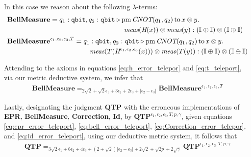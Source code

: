 \begin{example}
    In this case we reason about the following $\lambda$-terms:
    \begin{align*}
      &\textbf{BellMeasure} =  q_{1}: \mathtt{qbit}, q_{2}: \mathtt{qbit}
   \vljud  \text{pm} \, \textit{CNOT} (q_{1},q_{2})
  \,  \text{to}\, x \otimes y. \,
    \\ 
   & \hspace{170pt} \textit{meas} (\textit{H} (x)) \otimes \textit{meas} (y) : \left(\typeI\oplus \typeI\right) \otimes \left(\typeI\oplus
   \typeI\right) \\
      & \textbf{BellMeasure}^{\epsilon_1, \epsilon_2,\epsilon_3,T} =  q_{1}: \mathtt{qbit}, q_{2}: \mathtt{qbit}
      \vljud  \text{pm} \, \textit{CNOT} (q_{1},q_{2})
     \,  \text{to}\, x \otimes y. \,
     \\
      &  \hspace{120pt} \textit{meas} (T(\textit{H}^{\epsilon_1, \epsilon_2,\epsilon_3} (x))) \otimes \textit{meas} ( T(y)):\left(\typeI\oplus \typeI\right) \otimes \left(\typeI\oplus
      \typeI\right) \\
    \end{align*}
  
  Attending to the axioms in equations \eqref{eq:h_error_telepor} and \eqref{eq:t_teleport}, via our metric deductive system, we infer that
  \begin{align} \label{eq:bell_error_teleport}
    \textbf{BellMeasure} =_{2 \sqrt{2} + \sqrt{2}\epsilon_1 + 3\epsilon_2 + 2\epsilon_3 + |\epsilon_2-\epsilon_3|} \textbf{BellMeasure}^{\epsilon_1, \epsilon_2,\epsilon_3,T}
  \end{align}

  Lastly, designating the judgment \textbf{QTP} with the erroneous implementations of \textbf{EPR}, \textbf{BellMeasure}, \textbf{Correction}, \textbf{Id}, by $\textbf{QTP}^{\epsilon_1, \epsilon_2,\epsilon_3,T,p,\gamma}$, given equations \eqref{eq:epr_error_teleport}, \eqref{eq:bell_error_teleport}, \eqref{eq:Correction_error_telepor}, and  \eqref{eq:id_error_teleport}, using our deductive metric system, it follows that
  \begin{align*}
    \textbf{QTP} =_{ 3\sqrt{2}\epsilon_1 + 6\epsilon_2 + 4\epsilon_3 + (2+\sqrt{2})|\epsilon_2-\epsilon_3| + 2 \sqrt{2} + \sqrt{2p}  +2\sqrt{\gamma}} \textbf{QTP}^{\epsilon_1, \epsilon_2,\epsilon_3,T,p,\gamma}
  \end{align*}

\end{example}

